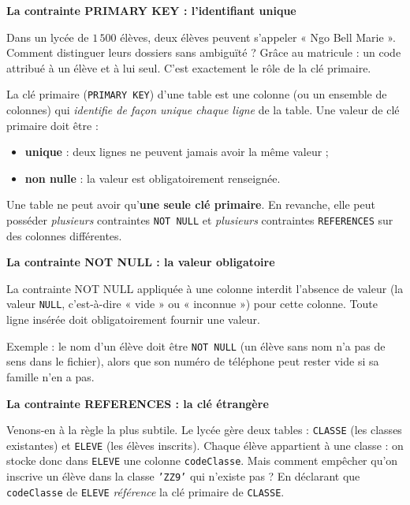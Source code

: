 \documentclass[11pt]{article}
\newcommand{\cle}[1]{{\popxbold\color{popdark}#1}}
\begin{document}
\textbf{La contrainte PRIMARY KEY : l'identifiant unique}\par

Dans un lycée de $1\,500$ élèves, deux élèves peuvent s'appeler « Ngo Bell Marie ». Comment distinguer leurs dossiers sans ambiguïté ? Grâce au matricule : un code attribué à un élève et à lui seul. C'est exactement le rôle de la clé primaire.

\begin{definition}
La \cle{clé primaire} (\texttt{PRIMARY KEY}) d'une table est une colonne (ou un ensemble de colonnes) qui \emph{identifie de façon unique chaque ligne} de la table. Une valeur de clé primaire doit être :
\begin{itemize}
\item \textbf{unique} : deux lignes ne peuvent jamais avoir la même valeur ;
\item \textbf{non nulle} : la valeur est obligatoirement renseignée.
\end{itemize}
\end{definition}

\begin{propriete}
Une table ne peut avoir qu'\textbf{une seule clé primaire}. En revanche, elle peut posséder \emph{plusieurs} contraintes \texttt{NOT NULL} et \emph{plusieurs} contraintes \texttt{REFERENCES} sur des colonnes différentes.
\end{propriete}

\textbf{La contrainte NOT NULL : la valeur obligatoire}\par

\begin{definition}
La contrainte \cle{NOT NULL} appliquée à une colonne interdit l'absence de valeur (la valeur \texttt{NULL}, c'est-à-dire « vide » ou « inconnue ») pour cette colonne. Toute ligne insérée doit obligatoirement fournir une valeur.
\end{definition}

Exemple : le nom d'un élève doit être \texttt{NOT NULL} (un élève sans nom n'a pas de sens dans le fichier), alors que son numéro de téléphone peut rester vide si sa famille n'en a pas.

\textbf{La contrainte REFERENCES : la clé étrangère}\par

Venons-en à la règle la plus subtile. Le lycée gère deux tables : \texttt{CLASSE} (les classes existantes) et \texttt{ELEVE} (les élèves inscrits). Chaque élève appartient à une classe : on stocke donc dans \texttt{ELEVE} une colonne \texttt{codeClasse}. Mais comment empêcher qu'on inscrive un élève dans la classe \texttt{'ZZ9'} qui n'existe pas ? En déclarant que \texttt{codeClasse} de \texttt{ELEVE} \emph{référence} la clé primaire de \texttt{CLASSE}.
\end{document}
